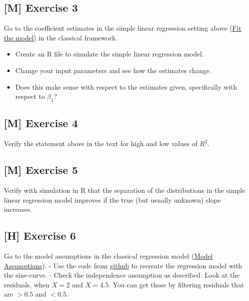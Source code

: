 \documentclass[
]{book}
\providecommand{\tightlist}{%
  \setlength{\itemsep}{0pt}\setlength{\parskip}{0pt}}
\begin{document}
\subsection{{[}M{]} Exercise 3}\label{exercise3_simpl_lin_reg}

Go to the coefficient estimates in the simple linear regression setting
above (\hyperref[fit_model_simple_lin_reg_classic]{Fit the model})
in the classical framework.

\begin{itemize}
\tightlist
\item
  Create an R file to simulate the simple linear regression model.
\item
  Change your input parameters and see how the estimates change.
\item
  Does this make sense with respect to the estimates given, specifically with respect
  to \(\beta_1\)?
\end{itemize}

\subsection{{[}M{]} Exercise 4}\label{exercise4_simpl_lin_reg}

Verify the statement above in the text for high and low values of \(R^2\).

\subsection{{[}M{]} Exercise 5}\label{exercise5_simpl_lin_reg}

Verify with simulation in R that the separation of the distributions in the simple linear regression model
improves if the true (but usually unknown) slope increases.

\subsection{{[}H{]} Exercise 6}\label{exercise6_simpl_lin_reg}

Go to the model assumptions in the classical regression model (\hyperref[_model_assumptions]{Model Assumptions}).
- Use the code from \href{https://github.com/jdegenfellner/Script_QM2_ZHAW/blob/main/02-Simple_Linear_Regression.Rmd}{github}
to recreate the regression model with the sine-curve.
- Check the independence assumption as described. Look at the residuals, when \(X=2\) and \(X=4.5\).
You can get those by filtering residuals that are \(>0.5\) and \(<0.5\).
\end{document}
